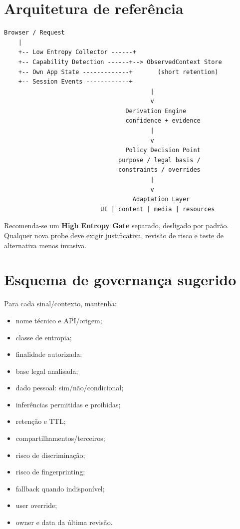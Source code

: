\documentclass[11pt,a4paper]{article}
\begin{document}
\section{Arquitetura de referência}
\begin{verbatim}
Browser / Request
    |
    +-- Low Entropy Collector ------+
    +-- Capability Detection ------+--> ObservedContext Store
    +-- Own App State -------------+       (short retention)
    +-- Session Events ------------+
                                         |
                                         v
                                  Derivation Engine
                                  confidence + evidence
                                         |
                                         v
                                  Policy Decision Point
                                purpose / legal basis /
                                constraints / overrides
                                         |
                                         v
                                    Adaptation Layer
                           UI | content | media | resources
\end{verbatim}

Recomenda-se um \textbf{High Entropy Gate} separado, desligado por padrão. Qualquer nova probe deve exigir justificativa, revisão de risco e teste de alternativa menos invasiva.

\section{Esquema de governança sugerido}
Para cada sinal/contexto, mantenha:
\begin{itemize}
\item nome técnico e API/origem;
\item classe de entropia;
\item finalidade autorizada;
\item base legal analisada;
\item dado pessoal: sim/não/condicional;
\item inferências permitidas e proibidas;
\item retenção e TTL;
\item compartilhamentos/terceiros;
\item risco de discriminação;
\item risco de fingerprinting;
\item fallback quando indisponível;
\item user override;
\item owner e data da última revisão.
\end{itemize}
\end{document}
